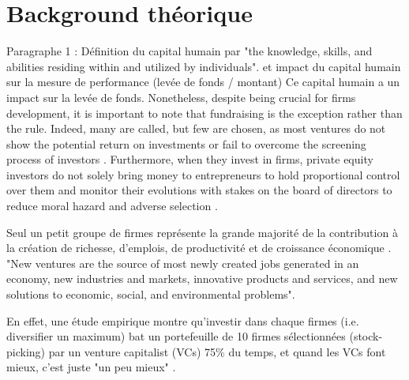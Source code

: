 \documentclass[12pt]{article}
\begin{document}
\section{Background théorique}

Paragraphe 1 : Définition du capital humain par \citep{becker1964human} "the knowledge, skills, and abilities residing within and utilized by individuals". et impact du capital humain sur la mesure de performance (levée de fonds / montant)
%
Ce capital humain a un impact sur la levée de fonds. Nonetheless, despite being crucial for firms development, it is important to note that fundraising is the exception rather than the rule. Indeed, many are called, but few are chosen, as most ventures do not show the potential return on investments or fail to overcome the screening process of investors \citep{huang2017growing}. Furthermore, when they invest in firms, private equity investors do not solely bring money to entrepreneurs to hold proportional control over them and monitor their evolutions with stakes on the board of directors to reduce moral hazard and adverse selection \citep{bertoni2011venture}.

Seul un petit groupe de firmes représente la grande majorité de la contribution à la création de richesse, d'emplois, de productivité et de croissance économique \citep{autio2016entrepreneurship}. "New ventures are the source of most newly created jobs generated in an economy, new industries and markets, innovative products and services, and new solutions to economic, social, and environmental problems".

En effet, une étude empirique montre qu'investir dans chaque firmes (i.e. diversifier un maximum) bat un portefeuille de 10 firmes sélectionnées (stock-picking) par un venture capitalist (VCs) 75\% du temps, et quand les VCs font mieux, c'est juste "un peu mieux" \citep{othman2020angelistdata}.
\end{document}
